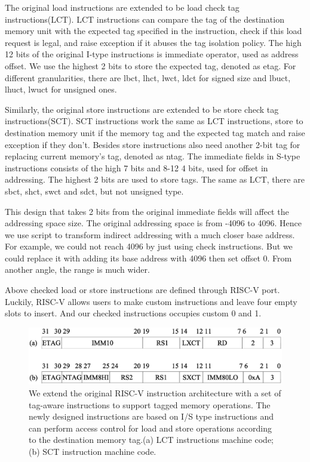 \documentclass[conference]{IEEEtran}
\begin{document}
The original load instructions are extended to be load check tag instructions(LCT). LCT instructions can compare the tag of the destination memory unit with the expected tag specified in the instruction, check if this load request is legal, and raise exception if it abuses the tag isolation policy. The high 12 bits of the original I-type instructions is immediate operator, used as address offset. We use the highest 2 bits to store the expected tag, denoted as etag. For different granularities, there are lbct, lhct, lwct, ldct for signed size and lbuct, lhuct, lwuct for unsigned ones.

Similarly, the original store instructions are extended to be store check tag instructions(SCT). SCT instructions work the same as LCT instructions, store to destination memory unit if the memory tag and the expected tag match and raise exception if they don't. Besides store instructions also need another 2-bit tag for replacing current memory's tag, denoted as ntag. The immediate fields in S-type instructions consists of the high 7 bits and 8-12 4 bits, used for offset in addressing. The highest 2 bits are used to store tags. The same as LCT, there are sbct, shct, swct and sdct, but not unsigned type.

This design that takes 2 bits from the original immediate fields will affect the addressing space size. The original addressing space is from -4096 to 4096. Hence we use script to transform indirect addressing with a much closer base address. For example, we could not reach 4096 by just using check instructions. But we could replace it with adding its base address with 4096 then set offset 0. From another angle, the range is much wider.

Above checked load or store instructions are defined through RISC-V port. Luckily, RISC-V allows users to make custom instructions and leave four empty slots to insert. And our checked instructions occupies custom 0 and 1.

\begin{figure}
	\includegraphics[width=\columnwidth]{LSCT.eps}
	\caption{We extend the original RISC-V instruction architecture with a set of tag-aware instructions to support tagged memory operations. The newly designed instructions are based on I/S type instructions and can perform access control for load and store operations according to the destination memory tag.(a) LCT instructions machine code; (b) SCT instruction machine code.}
	\label{fig:LSCT}
\end{figure}
\end{document}
